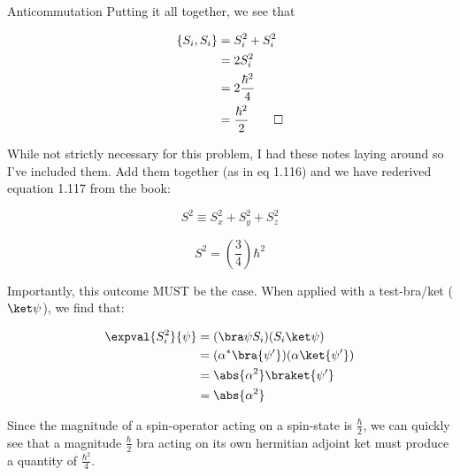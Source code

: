 \begin{answer}
\begin{answerpart}{Anticommutation}
    Putting it all together, we see that

    \begin{equation}
      \begin{split}
        \{S_i, S_i\}
        &= S_i^2 + S_i^2\\
        &= 2S_i^2\\
        &= 2\frac{\hbar^2}{4}\\
        &= \frac{\hbar^2}{2} \qed\\
      \end{split}
    \end{equation}

    While not strictly necessary for this problem, I had these notes
    laying around so I've included them.  Add them together (as in eq
    1.116) and we have rederived equation 1.117 from the book:

    \begin{equation}
      \tag{1.116}
      S^2 \equiv S_x^2 + S_y^2 + S_z^2
    \end{equation}
    
    \begin{equation}
      \tag{1.117}
      S^2 = \left(\frac 3 4\right) \hbar^2
    \end{equation}

    Importantly, this outcome MUST be the case.  When applied with a
    test-bra/ket ($\ket \psi$), we find that:

    \begin{equation}
      \begin{split}
        \expval{S_i^{2}}{\psi}
        &= (\bra \psi S_i ) (S_i \ket \psi)\\
        &= (\alpha^* \bra{\psi'}) (\alpha \ket{\psi'})\\
        &= \abs{\alpha^2} \braket{\psi'} \\
        &= \abs{\alpha^2}\\
      \end{split}
    \end{equation}

    Since the magnitude of a spin-operator acting on a spin-state is
    $\frac \hbar 2$, we can quickly see that a magnitude $\frac \hbar
    2$ bra acting on its own hermitian adjoint ket must produce a
    quantity of $\frac{\hbar^2}{4}$.

  \end{answerpart}

\end{answer}
